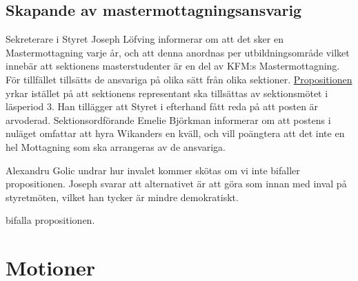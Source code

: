 \documentclass[hidelinks]{sektionsmote} %
\begin{document}
\subsection{Skapande av mastermottagningsansvarig}
Sekreterare i Styret Joseph Löfving informerar om att det sker en Mastermottagning varje år, och att denna anordnas per utbildningsområde vilket innebär att sektionens masterstudenter är en del av KFM:s Mastermottagning.
För tillfället tillsätts de ansvariga på olika sätt från olika sektioner.
\hyperlink{bilagor/propmma.pdf.1}{Propositionen} yrkar istället på att sektionens representant ska tillsättas av sektionsmötet i läsperiod 3.
Han tillägger att Styret i efterhand fått reda på att posten är arvoderad.
Sektionsordförande Emelie Björkman informerar om att postens i nuläget omfattar att hyra Wikanders en kväll, och vill poängtera att det inte en hel Mottagning som ska arrangeras av de ansvariga.\par
Alexandru Golic undrar hur invalet kommer skötas om vi inte bifaller propositionen.
Joseph svarar att alternativet är att göra som innan med inval på styretmöten, vilket han tycker är mindre demokratiskt.

\begin{beslut}
  \item bifalla propositionen.
\end{beslut}

\section{Motioner}
\end{document}
